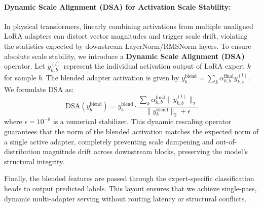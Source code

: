 \paragraph{Dynamic Scale Alignment (DSA) for Activation Scale Stability:}
In physical transformers, linearly combining activations from multiple unaligned LoRA adapters can distort vector magnitudes and trigger scale drift, violating the statistics expected by downstream LayerNorm/RMSNorm layers. To ensure absolute scale stability, we introduce a \textbf{Dynamic Scale Alignment (DSA)} operator. Let $y_{k, b}^{(l)}$ represent the individual activation output of LoRA expert $k$ for sample $b$. The blended adapter activation is given by $y^{\text{blend}}_b = \sum_k \alpha^{\text{final}}_{k, b} y_{k, b}^{(l)}$. We formulate DSA as:
\begin{equation}
    \text{DSA}\left( y^{\text{blend}}_b \right) = y^{\text{blend}}_b \cdot \frac{\sum_k \alpha^{\text{final}}_{k, b} \| y_{k, b}^{(l)} \|_2}{\| y^{\text{blend}}_b \|_2 + \epsilon}
\end{equation}
where $\epsilon = 10^{-8}$ is a numerical stabilizer. This dynamic rescaling operator guarantees that the norm of the blended activation matches the expected norm of a single active adapter, completely preventing scale dampening and out-of-distribution magnitude drift across downstream blocks, preserving the model's structural integrity.

Finally, the blended features are passed through the expert-specific classification heads to output predicted labels. This layout ensures that we achieve single-pass, dynamic multi-adapter serving without routing latency or structural conflicts.
